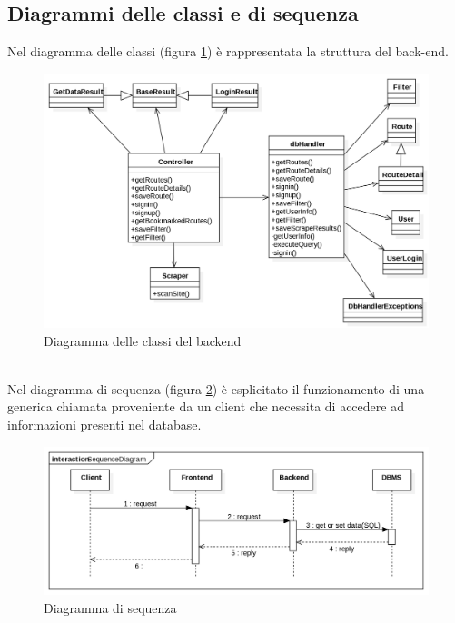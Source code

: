 \documentclass[11pt]{report}
\begin{document}
\subsection{Diagrammi delle classi e di sequenza}
Nel diagramma delle classi (figura \ref{class_diagram_backend}) è rappresentata la struttura del back-end.
\begin{figure}[h]
	\centering
	\includegraphics[scale=0.45]{ClassDiagram_Backend}
	\caption{Diagramma delle classi del backend \label{class_diagram_backend}}
\end{figure}
\\Nel diagramma di sequenza (figura \ref{sequence_diagram}) è esplicitato il funzionamento di una generica chiamata proveniente da un client che necessita di accedere ad informazioni presenti nel database.
\begin{figure}[h]
	\centering
	\includegraphics[scale=0.45]{SequenceDiagram}
	\caption{Diagramma di sequenza \label{sequence_diagram}}
\end{figure}
\end{document}
